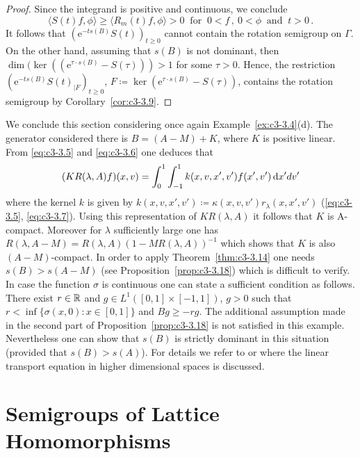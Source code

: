 \begin{proof}
Since the integrand is positive and continuous, we conclude
\begin{equation}\label{eq:c3-3.22}%
    \langle S(t)f,\phi\rangle \geq \langle R_{m}(t)f,\phi\rangle > 0 \ \text{ for } \ 0 < f \,,  \ 0 < \phi \ \text{ and } \ t > 0\,.
\end{equation}
It follows that $(\mathrm{e}^{-ts(B)}S(t))_{t \geq 0}$ cannot contain the rotation semigroup on $\Gamma$. 
On the other hand, assuming that $s(B)$ is not dominant, then $\dim(\ker((\mathrm{e}^{\tau\cdot s(B)} - S(\tau))) > 1$ for some $\tau > 0$. 
Hence, the restriction $(\mathrm{e}^{-ts(B)}S(t)_{|F})_{t \geq 0}$, $F \coloneqq  \ker(\mathrm{e}^{\tau\cdot s(B)}- S(\tau))$, contains the rotation semigroup by Corollary~\ref{cor:c3-3.9}.
\end{proof}

We conclude this section considering once again Example~\ref{ex:c3-3.4}(d).
The generator considered there is $B = (A - M) + K$, where $K$ is positive linear. 
From \eqref{eq:c3-3.5} and \eqref{eq:c3-3.6} one deduces that 
\[
(KR(\lambda,A)f)(x,v) = \int_{0}^{1}\int_{-1}^{1} k(x,v,x',v')f(x',v')\mathop{}\!\mathrm{d}{x}'dv'
\]
where the kernel $k$ is given by $k(x,v,x',v') \coloneqq  \kappa(x,v,v')r_{\lambda}(x,x',v')$ (\cf \eqref{eq:c3-3.5}, \eqref{eq:c3-3.7}). 
Using this representation of $KR(\lambda,A)$ it follows that $K$ is A-compact. 
Moreover for $\lambda$ sufficiently large one has $R(\lambda,A-M) = R(\lambda,A)(1 - MR(\lambda,A))^{-1}$ which shows that $K$ is also $(A-M)$-compact. 
In order to apply Theorem~\ref{thm:c3-3.14} one needs $s(B) > s(A-M)$ (see Proposition~\ref{prop:c3-3.18}) which is difficult to verify. 
In case the function $\sigma$ is continuous one can state a sufficient condition as follows.
There exist $r \in \mathbb{R} $ and $g \in L^{1}([0,1]\times[-1,1])$, $g > 0$ such that $r < \inf\{\sigma(x,0) \colon x \in [0,1]\}$ and $Bg \geq -rg$.
The additional assumption made in the second part of Proposition~\ref{prop:c3-3.18} is not satisfied in this example. 
Nevertheless one can show that $s(B)$ is strictly dominant in this situation (provided that $s(B) > s(A)$). 
For details we refer to \citet{greiner:1984d}  or \citet{voigt:1985} where the linear transport equation in higher dimensional spaces is discussed.


\section{Semigroups of Lattice Homomorphisms}\label{sec:c3-4}


